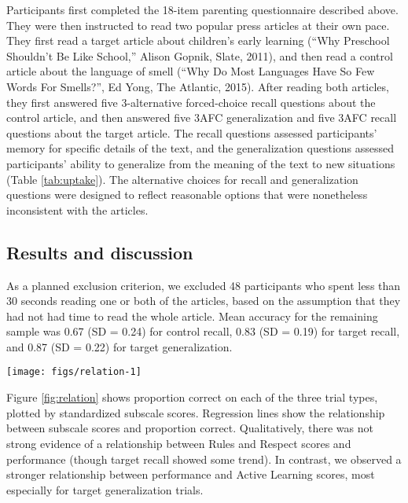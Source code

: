 \documentclass[10pt, letterpaper]{article}
\newenvironment{CodeChunk}{}{}
\begin{document}
Participants first completed the 18-item parenting questionnaire
described above. They were then instructed to read two popular press
articles at their own pace. They first read a target article about
children's early learning (``Why Preschool Shouldn't Be Like School,''
Alison Gopnik, Slate, 2011), and then read a control article about the
language of smell (``Why Do Most Languages Have So Few Words For
Smells?'', Ed Yong, The Atlantic, 2015). After reading both articles,
they first answered five 3-alternative forced-choice recall questions
about the control article, and then answered five 3AFC generalization
and five 3AFC recall questions about the target article. The recall
questions assessed participants' memory for specific details of the
text, and the generalization questions assessed participants' ability to
generalize from the meaning of the text to new situations (Table
\ref{tab:uptake}). The alternative choices for recall and generalization
questions were designed to reflect reasonable options that were
nonetheless inconsistent with the articles.

\subsection{Results and discussion}\label{results-and-discussion}

As a planned exclusion criterion, we excluded 48 participants who spent
less than 30 seconds reading one or both of the articles, based on the
assumption that they had not had time to read the whole article. Mean
accuracy for the remaining sample was 0.67 (SD = 0.24) for control
recall, 0.83 (SD = 0.19) for target recall, and 0.87 (SD = 0.22) for
target generalization.

\begin{CodeChunk}


\begin{center}\texttt{[image: figs/relation-1]} \end{center}

\end{CodeChunk}

Figure \ref{fig:relation} shows proportion correct on each of the three
trial types, plotted by standardized subscale scores. Regression lines
show the relationship between subscale scores and proportion correct.
Qualitatively, there was not strong evidence of a relationship between
Rules and Respect scores and performance (though target recall showed
some trend). In contrast, we observed a stronger relationship between
performance and Active Learning scores, most especially for target
generalization trials.
\end{document}
